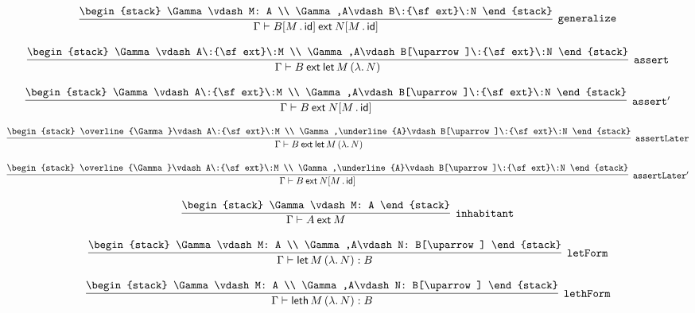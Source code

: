 \[
\infer[{\tt generalize}]{\Gamma \vdash B[M\,.\,{\sf id}]\:{\sf ext}\:N[M\,.\,{\sf id}]}{
\begin{stack}
\Gamma \vdash M: A
\\
\Gamma ,A\vdash B\:{\sf ext}\:N
\end{stack}}
\]

\[
\infer[{\tt assert}]{\Gamma \vdash B\:{\sf ext}\:{\sf let}\,M\,(\lambda .\,N)}{
\begin{stack}
\Gamma \vdash A\:{\sf ext}\:M
\\
\Gamma ,A\vdash B[\uparrow ]\:{\sf ext}\:N
\end{stack}}
\]

\[
\infer[{\tt assert'}]{\Gamma \vdash B\:{\sf ext}\:N[M\,.\,{\sf id}]}{
\begin{stack}
\Gamma \vdash A\:{\sf ext}\:M
\\
\Gamma ,A\vdash B[\uparrow ]\:{\sf ext}\:N
\end{stack}}
\]

\[
\infer[{\tt assertLater}]{\Gamma \vdash B\:{\sf ext}\:{\sf let}\,M\,(\lambda .\,N)}{
\begin{stack}
\overline{\Gamma}\vdash A\:{\sf ext}\:M
\\
\Gamma ,\underline{A}\vdash B[\uparrow ]\:{\sf ext}\:N
\end{stack}}
\]

\[
\infer[{\tt assertLater'}]{\Gamma \vdash B\:{\sf ext}\:N[M\,.\,{\sf id}]}{
\begin{stack}
\overline{\Gamma}\vdash A\:{\sf ext}\:M
\\
\Gamma ,\underline{A}\vdash B[\uparrow ]\:{\sf ext}\:N
\end{stack}}
\]

\[
\infer[{\tt inhabitant}]{\Gamma \vdash A\:{\sf ext}\:M}{
\begin{stack}
\Gamma \vdash M: A
\end{stack}}
\]

\[
\infer[{\tt letForm}]{\Gamma \vdash {\sf let}\,M\,(\lambda .\,N): B}{
\begin{stack}
\Gamma \vdash M: A
\\
\Gamma ,A\vdash N: B[\uparrow ]
\end{stack}}
\]

\[
\infer[{\tt lethForm}]{\Gamma \vdash {\sf leth}\,M\,(\lambda .\,N): B}{
\begin{stack}
\Gamma \vdash M: A
\\
\Gamma ,A\vdash N: B[\uparrow ]
\end{stack}}
\]

